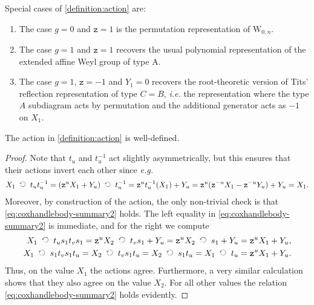 \documentclass[a4paper,11pt]{amsart}
\newcommand{\ie}{\textsl{i.e.}}
\newcommand{\eg}{\textsl{e.g.}}
\newcommand{\actsright}{\mathop{\,\;\raisebox{0ex}{\rotatebox{90}{$\circlearrowleft$}}\;\,}}
\newcommand{\setstuff}[1]{\mathrm{#1}}
\newcommand{\varsym}[1]{\mathtt{#1}}
\newcommand{\zvar}{\varsym{z}}
\numberwithin{equation}{section}
\let\fullref\autoref
\begin{document}
\begin{remark}\label{remark:action}
Special cases of \fullref{definition:action} are:	
\begin{enumerate}

\item The case $g=0$ and $\zvar=1$ is the permutation 
representation of $\setstuff{W}_{0,n}$.

\item The case $g=1$ and $\zvar=1$ recovers the usual 
polynomial representation of the extended affine Weyl group of type A.

\item The case $g=1$, $\zvar=-1$ and $Y_{1}=0$ recovers 
the root-theoretic version of Tits' reflection representation 
of type $C=B$, {\ie} the representation where the type 
$A$ subdiagram acts by permutation and the 
additional generator acts as 
$-1$ on $X_{1}$.
\end{enumerate}
\end{remark}

\begin{lemma}\label{lemma:action}
The action in \fullref{definition:action} is well-defined.
\end{lemma}

\begin{proof}
Note that 
$t_{u}$ and $t_{u}^{-1}$ act slightly asymmetrically, 
but this ensures that their actions invert each other since {\eg}
\begin{gather*}
X_{1}\actsright t_{u}t_{u}^{-1}
=
(\zvar^{u}X_{1}+Y_{u})\actsright t_{u}^{-1}
=
\zvar^{u}t_{u}^{-1}(X_{1})+Y_{u}
=
\zvar^{u}(\zvar^{-u}X_{1}-\zvar^{-u}Y_{u})+Y_{u}
=
X_{1}.
\end{gather*}
Moreover, by construction of the action, the only 
non-trivial check is that 
\eqref{eq:coxhandlebody-summary2} holds.
The left equality in \eqref{eq:coxhandlebody-summary2} 
is immediate, and for the right we compute
\begin{gather*}
\begin{aligned}
X_{1}\actsright t_{u}s_{1}t_{v}s_{1}
=\zvar^{u}X_{2}\actsright t_{v}s_{1}+Y_{u}
=\zvar^{u}X_{2}\actsright s_{1}+Y_{u}
&=\zvar^{u}X_{1}+Y_{u},
\\
X_{1}\actsright s_{1}t_{v}s_{1}t_{u}=
X_{2}\actsright t_{v}s_{1}t_{u}
=X_{2}\actsright s_{1}t_{u}
=X_{1}\actsright t_{u}
&=\zvar^{u}X_{1}+Y_{u}.
\end{aligned}
\end{gather*}
Thus, on the value $X_{1}$ the actions agree. Furthermore, 
a very similar calculation 
shows that they also agree on the value $X_{2}$.
For all other values the relation \eqref{eq:coxhandlebody-summary2} 
holds evidently.
\end{proof}
\end{document}
